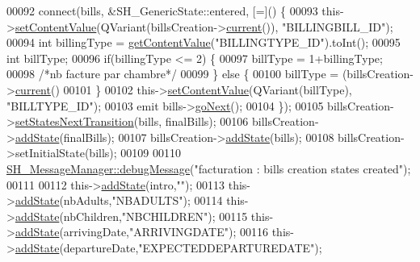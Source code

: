 \begin{DoxyCode}
00092     connect(bills, &SH\_GenericState::entered, [=]() \{
00093         this->\hyperlink{classSH__InOutStateMachine_a9ab1534306b2bdb62743d4bcefe40c17}{setContentValue}(QVariant(billsCreation->\hyperlink{classSH__LoopingInOutStateMachine_afce58401195a4941b1939c46f1caa23b}{current}()), \textcolor{stringliteral}{"BILLINGBILL\_ID"});
00094         \textcolor{keywordtype}{int} billingType = \hyperlink{classSH__InOutStateMachine_aa1a3bd3c0ea8a59b9bc916dc718eb9ca}{getContentValue}(\textcolor{stringliteral}{"BILLINGTYPE\_ID"}).toInt();
00095         \textcolor{keywordtype}{int} billType;
00096         \textcolor{keywordflow}{if}(billingType <= 2) \{
00097             billType = 1+billingType;
00098             \textcolor{comment}{/*nb facture par chambre*/}
00099         \} \textcolor{keywordflow}{else} \{
00100             billType = (billsCreation->\hyperlink{classSH__LoopingInOutStateMachine_afce58401195a4941b1939c46f1caa23b}{current}() %
00101         \}
00102         this->\hyperlink{classSH__InOutStateMachine_a9ab1534306b2bdb62743d4bcefe40c17}{setContentValue}(QVariant(billType), \textcolor{stringliteral}{"BILLTYPE\_ID"});
00103         emit bills->\hyperlink{classSH__GenericState_a34c1bebc765cc3a62d66c94c37d4f0c3}{goNext}();
00104     \});
00105     billsCreation->\hyperlink{classSH__LoopingInOutStateMachine_a0ee122553641721012f3710e71cce234}{setStatesNextTransition}(bills, finalBills);
00106     billsCreation->\hyperlink{classSH__InOutStateMachine_a3de9dedcdfd6efab868484c047638f71}{addState}(finalBills);
00107     billsCreation->\hyperlink{classSH__InOutStateMachine_a3de9dedcdfd6efab868484c047638f71}{addState}(bills);
00108     billsCreation->setInitialState(bills);
00109 
00110     \hyperlink{classSH__MessageManager_a379f2aa0a590a5add34dbe91f98b2ff7}{SH\_MessageManager::debugMessage}(\textcolor{stringliteral}{"facturation : bills creation states
       created"});
00111 
00112     this->\hyperlink{classSH__InOutStateMachine_a3de9dedcdfd6efab868484c047638f71}{addState}(intro,\textcolor{stringliteral}{""});
00113     this->\hyperlink{classSH__InOutStateMachine_a3de9dedcdfd6efab868484c047638f71}{addState}(nbAdults,\textcolor{stringliteral}{"NBADULTS"});
00114     this->\hyperlink{classSH__InOutStateMachine_a3de9dedcdfd6efab868484c047638f71}{addState}(nbChildren,\textcolor{stringliteral}{"NBCHILDREN"});
00115     this->\hyperlink{classSH__InOutStateMachine_a3de9dedcdfd6efab868484c047638f71}{addState}(arrivingDate,\textcolor{stringliteral}{"ARRIVINGDATE"});
00116     this->\hyperlink{classSH__InOutStateMachine_a3de9dedcdfd6efab868484c047638f71}{addState}(departureDate,\textcolor{stringliteral}{"EXPECTEDDEPARTUREDATE"});

\end{DoxyCode}
